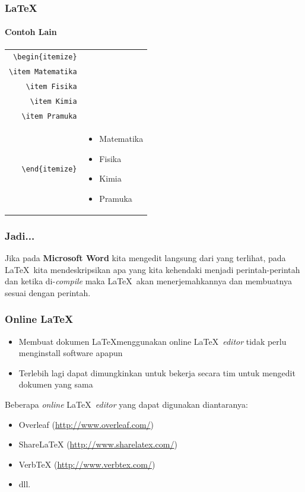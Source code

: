 \documentclass[aspectratio=169]{beamer}
\begin{document}
\begin{frame}[fragile]
\frametitle{\LaTeX}
\framesubtitle{Contoh Lain}
\begin{table}[]
\begin{tabular}{r|l}
\verb|\begin{itemize}|\\
\verb|\item Matematika|\\
\verb|\item Fisika|\\
\verb|\item Kimia|\\
\verb|\item Pramuka|\\
\verb|\end{itemize}| &
  \begin{minipage}[t]{0.4\textwidth}
    \begin{itemize}
    \item Matematika
    \item Fisika
    \item Kimia
    \item Pramuka
    \end{itemize}
  \end{minipage}
\end{tabular}
\end{table}
\end{frame}

\begin{frame}
\frametitle{Jadi...}
Jika pada \textbf{Microsoft Word} kita mengedit langsung dari yang terlihat, pada \LaTeX\ kita mendeskripsikan apa yang kita kehendaki menjadi perintah-perintah dan ketika di-\textit{compile} maka \LaTeX\ akan menerjemahkannya dan membuatnya sesuai dengan perintah.
\end{frame}

\begin{frame}
\frametitle{Online \LaTeX}
\begin{itemize}
    \item Membuat dokumen \LaTeX menggunakan online \LaTeX\ \textit{editor} tidak perlu menginstall software apapun
    \item Terlebih lagi dapat dimungkinkan untuk bekerja secara tim untuk mengedit dokumen yang sama
\end{itemize}
Beberapa \textit{online} \LaTeX\ \textit{editor} yang dapat digunakan diantaranya:
\begin{itemize}
    \item Overleaf (\url{http://www.overleaf.com/})
    \item ShareLaTeX (\url{http://www.sharelatex.com/})
    \item VerbTeX (\url{http://www.verbtex.com/})
    \item dll.
\end{itemize}
\end{frame}
\end{document}
